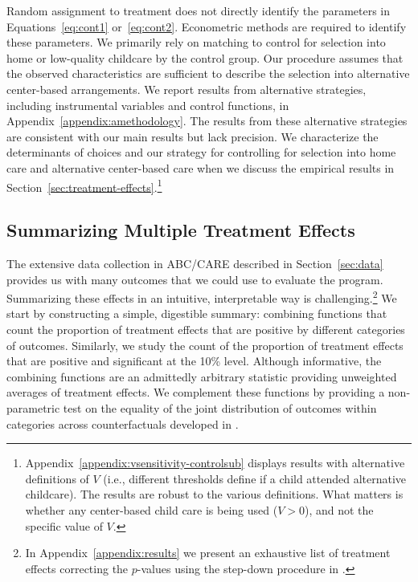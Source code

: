Random assignment to treatment does not directly identify the parameters in Equations~\eqref{eq:cont1} or~\eqref{eq:cont2}. Econometric methods are required to identify these parameters. We primarily rely on matching to control for selection into home or low-quality childcare by the control group. Our procedure assumes that the observed characteristics are sufficient to describe the selection into alternative center-based arrangements. We report results from alternative strategies, including instrumental variables and control functions, in Appendix~\ref{appendix:amethodology}. The results from these alternative strategies are consistent with our main results but lack precision. We characterize the determinants of choices and our strategy for controlling for selection into home care and alternative center-based care when we discuss the empirical results in Section~\ref{sec:treatment-effects}.\footnote{Appendix~\ref{appendix:vsensitivity-controlsub} displays results with alternative definitions of $V$ (i.e., different thresholds define if a child attended alternative childcare). The results are robust to the various definitions. What matters is whether any center-based child care is being used ($V>0$), and not the specific value of $V$.}

\subsection{Summarizing Multiple Treatment Effects}\label{sec:combining-functions}

The extensive data collection in ABC/CARE described in Section~\ref{sec:data} provides us with many outcomes that we could use to evaluate the program. Summarizing these effects in an intuitive, interpretable way is challenging.\footnote{In Appendix~\ref{appendix:results} we present an exhaustive list of treatment effects correcting the $p$-values using the step-down procedure in \citet{Romano_Wolf_2016_pval_SaPL}.} We start by constructing a simple, digestible summary: combining functions that count the proportion of treatment effects that are positive by different categories of outcomes. Similarly, we study the count of the proportion of treatment effects that are positive and significant at the 10\% level. Although informative, the combining functions are an admittedly arbitrary statistic providing unweighted averages of treatment effects. We complement these functions by providing a non-parametric test on the equality of the joint distribution of outcomes within categories across counterfactuals developed in \citep{Rosenbaum_2005_Distribution_JRSS}.


